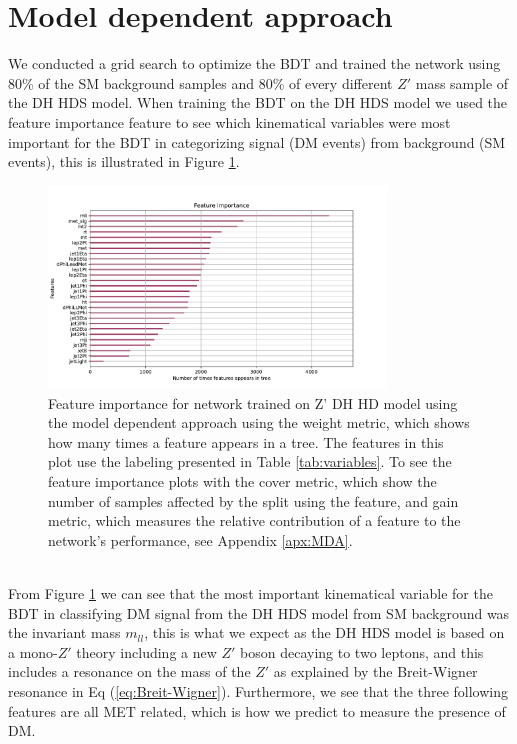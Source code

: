 \documentclass[12pt, a4paper]{book}
\begin{document}
\graphicspath{{../../../Plots/}}
\section{Model dependent approach}\label{sec:Walkthrough}
We conducted a grid search to optimize the BDT and trained the network using 80\% of the SM background samples and 80\% of every different $Z'$ mass sample of the DH HDS model. When training the BDT on the DH HDS model we used the feature importance feature to see which kinematical variables were most important for the BDT in 
categorizing signal (DM events) from background (SM events), this is illustrated in Figure \ref{fig:DH_HDS_feat}. 
\begin{figure}[!ht]
	\centering
      \includegraphics[width=0.8\textwidth]{XGBoost/DH_HDS/feature_importance/weight.pdf}
   \caption[Feature importance for network trained on Z' DH HD model using the model dependent approach]{Feature importance for network trained on Z' DH HD model using the model dependent approach using the weight metric, which shows how many times a feature appears in a tree. The features in this plot use the labeling presented in Table \ref{tab:variables}. 
   To see the feature importance plots with the cover metric, which show the number of samples affected by the split using the feature, and gain metric, which measures the relative contribution of a feature to the network's performance, see Appendix \ref{apx:MDA}.}\label{fig:DH_HDS_feat}
\end{figure}
\\From Figure \ref{fig:DH_HDS_feat} we can see that the most important kinematical variable for the BDT in classifying DM signal from the DH HDS model from SM background was the invariant mass $m_{ll}$, this is what we expect as the DH HDS model is based 
on a mono-$Z'$ theory including a new $Z'$ boson decaying to two leptons, and this includes a resonance on the mass of the $Z'$ as explained by the Breit-Wigner resonance in Eq (\ref{eq:Breit-Wigner}). Furthermore, we see that the three following features are all MET related, which is how we predict to measure the presence of DM. 
\end{document}
